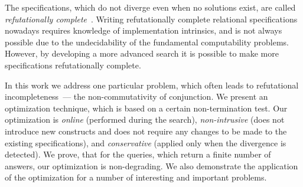 The specifications, which do not diverge even when no solutions exist, are called \emph{refutationally complete}~\cite{WillThesis}. Writing 
refutationally complete relational specifications nowadays requires knowledge of \miniKanren implementation intrinsics, and is not always
possible due to the undecidability of the fundamental computability problems. However, by developing a more advanced search it is possible
to make more specifications refutationally complete.

In this work we address one particular problem, which often leads to refutational incompleteness~--- the non-commutativity of
conjunction. We present an optimization technique, which is based on a certain non-termination test. Our optimization
is \emph{online} (performed during the search), \emph{non-intrusive} (does not introduce new constructs and does not require
any changes to be made to the existing specifications), and \emph{conservative} (applied only when the divergence
is detected). We prove, that for the queries, which return a finite number of answers, our optimization is non-degrading. 
We also demonstrate the application of the optimization for a number of interesting and important problems.
